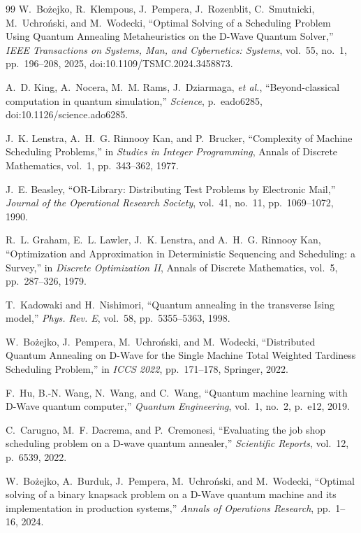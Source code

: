 \begin{thebibliography}{99}
W.~Bożejko, R.~Klempous, J.~Pempera, J.~Rozenblit, C.~Smutnicki, M.~Uchroński, and M.~Wodecki,
``Optimal Solving of a Scheduling Problem Using Quantum Annealing Metaheuristics on the D-Wave Quantum Solver,''
\textit{IEEE Transactions on Systems, Man, and Cybernetics: Systems},
vol.~55, no.~1, pp.~196--208, 2025, doi:10.1109/TSMC.2024.3458873.

A.~D. King, A.~Nocera, M.~M. Rams, J.~Dziarmaga, \textit{et al.},
``Beyond-classical computation in quantum simulation,''
\textit{Science}, p.~eado6285, doi:10.1126/science.ado6285.

J.~K. Lenstra, A.~H.~G. Rinnooy Kan, and P.~Brucker,
``Complexity of Machine Scheduling Problems,''
in \textit{Studies in Integer Programming}, Annals of Discrete Mathematics, vol.~1, pp.~343--362, 1977.

J.~E. Beasley,
``OR-Library: Distributing Test Problems by Electronic Mail,''
\textit{Journal of the Operational Research Society},
vol.~41, no.~11, pp.~1069--1072, 1990.

R.~L. Graham, E.~L. Lawler, J.~K. Lenstra, and A.~H.~G. Rinnooy Kan,
``Optimization and Approximation in Deterministic Sequencing and Scheduling: a Survey,''
in \textit{Discrete Optimization II}, Annals of Discrete Mathematics, vol.~5, pp.~287--326, 1979.

T.~Kadowaki and H.~Nishimori,
``Quantum annealing in the transverse Ising model,''
\textit{Phys. Rev. E}, vol.~58, pp.~5355--5363, 1998.

W.~Bożejko, J.~Pempera, M.~Uchroński, and M.~Wodecki,
``Distributed Quantum Annealing on D-Wave for the Single Machine Total Weighted Tardiness Scheduling Problem,''
in \textit{ICCS 2022}, pp.~171--178, Springer, 2022.

F.~Hu, B.-N. Wang, N.~Wang, and C.~Wang,
``Quantum machine learning with D-Wave quantum computer,''
\textit{Quantum Engineering}, vol.~1, no.~2, p.~e12, 2019.

C.~Carugno, M.~F. Dacrema, and P.~Cremonesi,
``Evaluating the job shop scheduling problem on a D-wave quantum annealer,''
\textit{Scientific Reports}, vol.~12, p.~6539, 2022.

W.~Bożejko, A.~Burduk, J.~Pempera, M.~Uchroński, and M.~Wodecki,
``Optimal solving of a binary knapsack problem on a D-Wave quantum machine and its implementation in production systems,''
\textit{Annals of Operations Research}, pp.~1--16, 2024.


\end{thebibliography}
